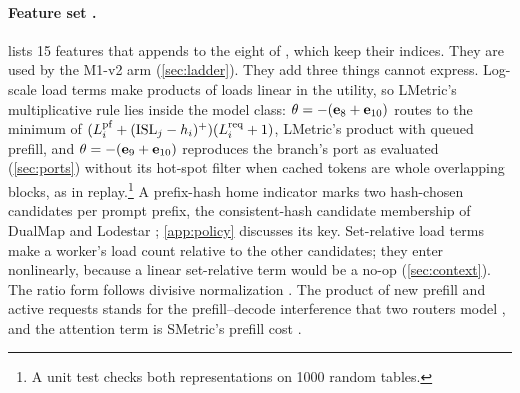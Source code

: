 \paragraph{Feature set .}
 lists 15 features that  appends to the eight of , which
keep their indices. They are used by the M1-v2 arm (\cref{sec:ladder}). They add three things
 cannot express. Log-scale load terms make products of loads linear in the utility, so
LMetric's multiplicative rule \citep{zhang2026lmetric} lies inside the model class:
$\theta = -(\mathbf{e}_{8} + \mathbf{e}_{10})$ routes to the minimum of
$(L^{\mathrm{pf}}_i + (\mathrm{ISL}_j - h_i)^+)(L^{\mathrm{req}}_i + 1)$, LMetric's product with queued prefill, and
$\theta = -(\mathbf{e}_{9} + \mathbf{e}_{10})$ reproduces the branch's  port as evaluated
(\cref{sec:ports}) without its hot-spot filter when cached tokens are whole overlapping blocks, as in
replay.\footnote{A unit test checks both representations on \num{1000} random tables.}
A prefix-hash home indicator marks two hash-chosen candidates per
prompt prefix, the consistent-hash candidate membership of DualMap and Lodestar
\citep{yuan2026dualmap,lim2026lodestar}; \cref{app:policy} discusses its key.
Set-relative load terms make a worker's load count relative to the other candidates; they enter
nonlinearly, because a linear set-relative term would be a no-op (\cref{sec:context}). The ratio
form follows divisive normalization \citep{webb2021normalization}. The product of new prefill and
active requests stands for the prefill--decode interference that two routers model
\citep{jain2024intelligent,srivatsa2025preble}, and the attention term is SMetric's prefill cost
\citep{wang2026smetric}.

